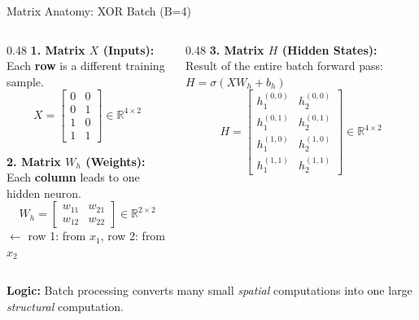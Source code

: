 \documentclass[5pt,aspectratio=169]{beamer}
\begin{document}
\begin{frame}{Matrix Anatomy: XOR Batch (B=4)}
\begin{columns}[T]
\begin{column}{0.48\textwidth}
\textbf{1. Matrix $X$ (Inputs):} \\
Each \textbf{row} is a different training sample.
\[ X = \begin{bmatrix} 0 & 0 \\ 0 & 1 \\ 1 & 0 \\ 1 & 1 \end{bmatrix} \in \mathbb{R}^{4 \times 2} \]

\textbf{2. Matrix $W_h$ (Weights):} \\
Each \textbf{column} leads to one hidden neuron.
\[ W_h = \begin{bmatrix} w_{11} & w_{21} \\ w_{12} & w_{22} \end{bmatrix} \in \mathbb{R}^{2 \times 2} \]
{\tiny $\leftarrow$ row 1: from $x_1$, row 2: from $x_2$}
\end{column}

\begin{column}{0.48\textwidth}
\textbf{3. Matrix $H$ (Hidden States):} \\
Result of the entire batch forward pass: $H = \sigma(X W_h + b_h)$
\[ H = \begin{bmatrix} h_1^{(0,0)} & h_2^{(0,0)} \\ h_1^{(0,1)} & h_2^{(0,1)} \\ h_1^{(1,0)} & h_2^{(1,0)} \\ h_1^{(1,1)} & h_2^{(1,1)} \end{bmatrix} \in \mathbb{R}^{4 \times 2} \]
\end{column}
\end{columns}

\vfill
\centering
\textbf{Logic:} Batch processing converts many small \textit{spatial} computations into one large \textit{structural} computation.
\end{frame}
\end{document}
